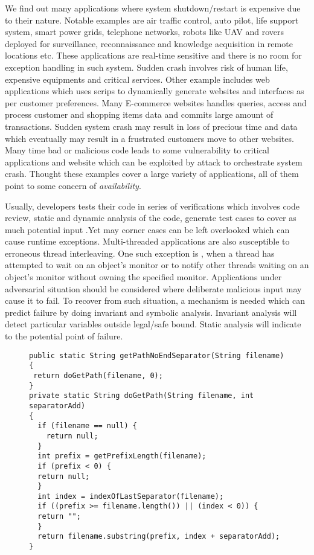 We find out many applications where system shutdown/restart is expensive due to
their nature.
Notable examples are air traffic control, auto pilot, life support system, smart
power grids, telephone networks, robots like UAV and rovers deployed for
surveillance, reconnaissance and knowledge acquisition in remote locations etc.
These applications are real-time sensitive and there is no room for exception
handling in such system.
Sudden crash involves risk of human life, expensive equipments and critical
services.
Other example includes web applications which uses scrips to dynamically
generate websites and interfaces as per customer preferences.
Many E-commerce websites handles queries, access and process customer and
shopping items data and commits large amount of transactions.
Sudden system crash may result in loss of precious time and data which
eventually may result in a frustrated customers move to other websites.
Many time bad or malicious code leads to some vulnerability to critical
applications and website which can be exploited by attack to orchestrate system
crash. Thought these examples cover a large variety of applications, all of them
point to some concern of \emph{availability}.

Usually, developers tests their code in series of verifications which involves
code review, static and dynamic analysis of the code, generate test cases to
cover as much potential input .Yet may corner cases can be left overlooked which
can cause runtime exceptions.
Multi-threaded applications are also susceptible to erroneous thread
interleaving. One such exception is
, when a thread has attempted to
wait on an object's monitor or to notify other threads waiting on an object's
monitor without owning the specified monitor. Applications under adversarial
situation should be considered where deliberate malicious input may cause it to
fail. To recover from such situation, a mechanism is needed which can predict
failure by doing invariant and symbolic analysis. Invariant analysis will detect
particular variables outside legal/safe bound. Static analysis will indicate
to the potential point of failure.


\begin{figure}[t]
\begin{lstlisting}
public static String getPathNoEndSeparator(String filename){
 return doGetPath(filename, 0);
}
private static String doGetPath(String filename, int separatorAdd)
{
  if (filename == null) {
    return null;
  }
  int prefix = getPrefixLength(filename);
  if (prefix < 0) {
  return null;
  }
  int index = indexOfLastSeparator(filename);
  if ((prefix >= filename.length()) || (index < 0)) {
  return "";
  }
  return filename.substring(prefix, index + separatorAdd);
}
\end{lstlisting}
\end{figure}

